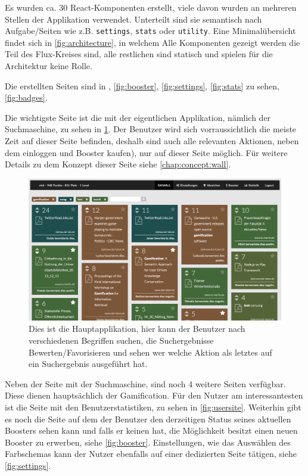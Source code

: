 \documentclass[12pt,twoside]{book}
\begin{document}
Es wurden ca. 30 React-Komponenten erstellt, viele davon wurden an mehreren Stellen der Applikation verwendet. Unterteilt sind sie semantisch nach Aufgabe/Seiten wie z.B. \texttt{settings}, \texttt{stats} oder \texttt{utility}.
Eine Minimalübersicht findet sich in \ref{fig:architecture}, in welchem Alle Komponenten gezeigt werden die Teil des Flux-Kreises sind, alle restlichen sind statisch und spielen für die Architektur keine Rolle.

Die erstellten Seiten sind in , \ref{fig:booster}, \ref{fig:settings}, \ref{fig:stats} zu sehen, \ref{fig:badges}.


Die wichtigste Seite ist die mit der eigentlichen Applikation, nämlich der Suchmaschine, zu sehen in \ref{fig:wall}. Der Benutzer wird sich vorraussichtlich die meiste Zeit auf dieser Seite befinden, deshalb sind auch alle relevanten Aktionen, neben dem einloggen und Booster kaufen), nur auf dieser Seite möglich. Für weitere Details zu dem Konzept dieser Seite siehe \ref{chap:concept:wall}.

\begin{figure}[h]
    \centering
    \includegraphics[width=1.0\textwidth]{images/infoboard_wall.png}
    \caption{Dies ist die Hauptapplikation, hier kann der Benutzer nach verschiedenen Begriffen suchen, die Suchergebnisse Bewerten/Favorisieren und sehen wer welche Aktion als letztes auf ein Suchergebnis ausgeführt hat.}
    \label{fig:wall}
\end{figure}

Neben der Seite mit der Suchmaschine, sind noch 4 weitere Seiten verfügbar. Diese dienen hauptsächlich der Gamification. Für den Nutzer am interessantesten ist die Seite mit den Benutzerstatistiken, zu sehen in \ref{fig:usersite}.
Weiterhin gibt es noch die Seite auf dem der Benutzer den derzeitigen Status seines aktuellen Boosters sehen kann und falls er keinen hat, die Möglichkeit besitzt einen neuen Booster zu erwerben, siehe \ref{fig:booster}. Einstellungen, wie das Auswählen des Farbschemas kann der Nutzer ebenfalls auf einer dedizierten Seite tätigen, siehe \ref{fig:settings}.
\end{document}
